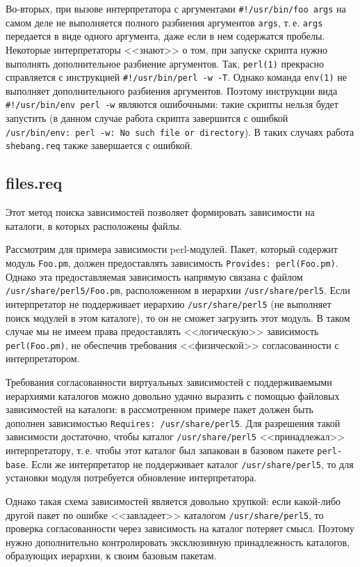 \documentclass[russian,a4paper,12pt,titlepage]{article}
\begin{document}
Во-вторых, при вызове интерпретатора с аргументами \verb|#!/usr/bin/foo args| на самом деле не выполняется
полного разбиения аргументов \verb|args|, т.\,е. \verb|args| передается в виде одного аргумента, даже если в нем содержатся
пробелы.  Некоторые интерпретаторы <<знают>> о том, при запуске скрипта нужно выполнять дополнительное разбиение
аргументов.  Так, \verb|perl(1)| прекрасно справляется с инструкцией \verb|#!/usr/bin/perl -w -T|.  Однако
команда \verb|env(1)| не выполняет дополнительного разбиения аргументов.  Поэтому инструкции вида \verb|#!/usr/bin/env perl -w|
являются ошибочными: такие скрипты нельзя будет запустить (в данном случае работа скрипта завершится с ошибкой
\texttt{/usr/bin/env: perl -w: No such file or directory}).  В таких случаях работа \verb|shebang.req|
также завершается с ошибкой.

\subsection{files.req}
\label{files-req}
Этот метод поиска зависимостей позволяет формировать зависимости на каталоги, в которых расположены файлы.

Рассмотрим для примера зависимости perl-модулей.  Пакет, который содержит модуль \verb|Foo.pm|,
должен предоставлять зависимость \texttt{Provides: perl(Foo.pm)}.  Однако эта предоставляемая зависимость
напрямую связана с файлом \texttt{/usr/share/perl5/Foo.pm}, расположенном в иерархии \verb|/usr/share/perl5|.
Если интерпретатор не поддерживает иерархию \verb|/usr/share/perl5| (не выполняет поиск модулей в этом каталоге),
то он не сможет загрузить этот модуль.  В таком случае мы не имеем права предоставлять <<логическую>> зависимость
\verb|perl(Foo.pm)|, не обеспечив требования <<физической>> согласованности с интерпретатором.

Требования согласованности виртуальных зависимостей с поддерживаемыми иерархиями каталогов можно довольно
удачно выразить с помощью файловых зависимостей на каталоги: в рассмотренном примере пакет должен быть
дополнен зависимостью \texttt{Requires: /usr/share/perl5}.  Для разрешения такой зависимости достаточно,
чтобы каталог \verb|/usr/share/perl5| <<принадлежал>> интерпретатору, т.\,е. чтобы этот каталог был
запакован в базовом пакете \verb|perl-base|.  Если же интерпретатор не поддерживает каталог \verb|/usr/share/perl5|,
то для установки модуля потребуется обновление интерпретатора.

Однако такая схема зависимостей является довольно хрупкой: если какой-либо другой пакет по ошибке <<завладеет>>
каталогом \verb|/usr/share/perl5|, то проверка согласованности через зависимость на каталог потеряет смысл.
Поэтому нужно дополнительно контролировать эксклюзивную принадлежность каталогов, образующих иерархии,
к своим базовым пакетам.
\end{document}
